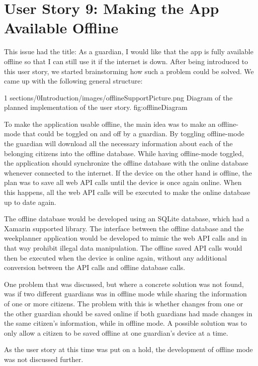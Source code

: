 \section{User Story 9: Making the App Available Offline}
\label{sect:OfflineSupportFirstUserStory}
This issue had the title: As a guardian, I would like that the app is fully available offline so that I can still use it if the internet is down.
After being introduced to this user story, we started brainstorming how such a problem could be solved. We came up with the following general structure:

        {1} %
        {sections/0Introduction/images/offlineSupportPicture.png} %
        {Diagram of the planned implementation of the user story.} %
        {fig:offlineDiagram} %

To make the application usable offline, the main idea was to make an offline-mode that could be toggled on and off by a guardian. By toggling offline-mode the guardian will download all the necessary information about each of the belonging citizens into the offline database. While having offline-mode toggled, the application should synchronize the offline database with the online database whenever connected to the internet. If the device on the other hand is offline, the plan was to save all web API calls until the device is once again online. When this happens, all the web API calls will be executed to make the online database up to date again. 

The offline database would be developed using an SQLite database, which had a Xamarin supported library. The interface between the offline database and the weekplanner application would be developed to mimic the web API calls and in that way prohibit illegal data manipulation. The offline saved API calls would then be executed when the device is online again, without any additional conversion between the API calls and offline database calls.

One problem that was discussed, but where a concrete solution was not found, was if two different guardians was in offline mode while sharing the information of one or more citizens. 
The problem with this is whether changes from one or the other guardian should be saved online if both guardians had made changes in the same citizen's information, while in offline mode. 
A possible solution was to only allow a citizen to be saved offline at one guardian's device at a time.

As the user story at this time was put on a hold, the development of offline mode was not discussed further.